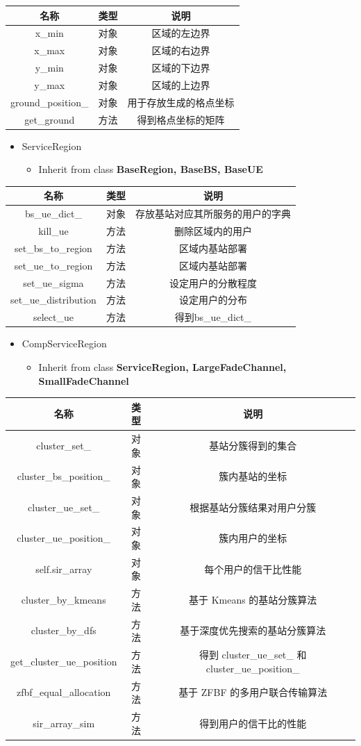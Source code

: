 \documentclass[11pt]{article}
\providecommand{\tightlist}{%
      \setlength{\itemsep}{0pt}\setlength{\parskip}{0pt}}
\begin{document}
\begin{longtable}[c]{@{}ccc@{}}
\toprule
名称 & 类型 & 说明\tabularnewline
\midrule
\endhead
x\_min & 对象 & 区域的左边界\tabularnewline
x\_max & 对象 & 区域的右边界\tabularnewline
y\_min & 对象 & 区域的下边界\tabularnewline
y\_max & 对象 & 区域的上边界\tabularnewline
ground\_position\_ & 对象 & 用于存放生成的格点坐标\tabularnewline
get\_ground & 方法 & 得到格点坐标的矩阵\tabularnewline
\bottomrule
\end{longtable}

\begin{itemize}
\tightlist
\item
  ServiceRegion

  \begin{itemize}
  \tightlist
  \item
    Inherit from class \textbf{BaseRegion, BaseBS, BaseUE}
  \end{itemize}
\end{itemize}

\begin{longtable}[c]{@{}ccc@{}}
\toprule
名称 & 类型 & 说明\tabularnewline
\midrule
\endhead
bs\_ue\_dict\_ & 对象 & 存放基站对应其所服务的用户的字典\tabularnewline
kill\_ue & 方法 & 删除区域内的用户\tabularnewline
set\_bs\_to\_region & 方法 & 区域内基站部署\tabularnewline
set\_ue\_to\_region & 方法 & 区域内基站部署\tabularnewline
set\_ue\_sigma & 方法 & 设定用户的分散程度\tabularnewline
set\_ue\_distribution & 方法 & 设定用户的分布\tabularnewline
select\_ue & 方法 & 得到bs\_ue\_dict\_\tabularnewline
\bottomrule
\end{longtable}

\begin{itemize}
\tightlist
\item
  CompServiceRegion

  \begin{itemize}
  \tightlist
  \item
    Inherit from class \textbf{ServiceRegion, LargeFadeChannel,
    SmallFadeChannel}
  \end{itemize}
\end{itemize}

\begin{longtable}[c]{@{}ccc@{}}
\toprule
名称 & 类型 & 说明\tabularnewline
\midrule
\endhead
cluster\_set\_ & 对象 & 基站分簇得到的集合\tabularnewline
cluster\_bs\_position\_ & 对象 & 簇内基站的坐标\tabularnewline
cluster\_ue\_set\_ & 对象 & 根据基站分簇结果对用户分簇\tabularnewline
cluster\_ue\_position\_ & 对象 & 簇内用户的坐标\tabularnewline
self.sir\_array & 对象 & 每个用户的信干比性能\tabularnewline
cluster\_by\_kmeans & 方法 & 基于 Kmeans 的基站分簇算法\tabularnewline
cluster\_by\_dfs & 方法 & 基于深度优先搜索的基站分簇算法\tabularnewline
get\_cluster\_ue\_position & 方法 & 得到 cluster\_ue\_set\_ 和
cluster\_ue\_position\_\tabularnewline
zfbf\_equal\_allocation & 方法 & 基于 ZFBF
的多用户联合传输算法\tabularnewline
sir\_array\_sim & 方法 & 得到用户的信干比的性能\tabularnewline
\bottomrule
\end{longtable}
\end{document}
